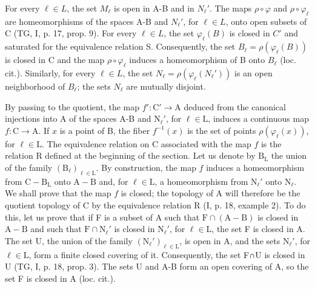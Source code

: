 For every \(\ell \in L\), the set \(M_{\ell}\) is open in A-B and in \(N_{\ell}'\). The maps \(\rho \circ \varphi\) and \(\rho \circ \varphi_{\ell}\) are homeomorphisms of the spaces A-B and \(N_{\ell}'\), for \(\ell \in L\), onto open subsets of C (TG, I, p. 17, prop. 9). For every \(\ell \in L\), the set \(\varphi_{\ell}(B)\) is closed in \(C'\) and saturated for the equivalence relation S. Consequently, the set \(B_{\ell} = \rho(\varphi_{\ell}(B))\) is closed in C and the map \(\rho \circ \varphi_{\ell}\) induces a homeomorphism of B onto \(B_{\ell}\) (loc. cit.). Similarly, for every \(\ell \in L\), the set \(N_{\ell} = \rho(\varphi_{\ell}(N_{\ell}'))\) is an open neighborhood of \(B_{\ell}\); the sets \(N_{\ell}\) are mutually disjoint.

By passing to the quotient, the map \(f' \colon \mathrm{C}' \to \mathrm{A}\) deduced from the canonical injections into A of the spaces A-B and \(\mathrm{N}_{\ell}'\), for \(\ell \in \mathrm{L}\), induces a continuous map \(f \colon \mathrm{C} \to \mathrm{A}\). If \(x\) is a point of B, the fiber \(f^{-1}(x)\) is the set of points \(\rho(\varphi_{\ell}(x))\), for \(\ell \in \mathrm{L}\). The equivalence relation on C associated with the map \(f\) is the relation R defined at the beginning of the section. Let us denote by \(\mathrm{B}_{\mathrm{L}}\) the union of the family \((\mathrm{B}_{\ell})_{\ell \in \mathrm{L}}\). By construction, the map \(f\) induces a homeomorphism from \(\mathrm{C} - \mathrm{B}_{\mathrm{L}}\) onto \(\mathrm{A} - \mathrm{B}\) and, for \(\ell \in \mathrm{L}\), a homeomorphism from \(\mathrm{N}_{\ell}'\) onto \(\mathrm{N}_{\ell}\). We shall prove that the map \(f\) is closed; the topology of A will therefore be the quotient topology of C by the equivalence relation R (I, p. 18, example 2). To do this, let us prove that if F is a subset of A such that \(\mathrm{F} \cap (\mathrm{A} - \mathrm{B})\) is closed in \(\mathrm{A} - \mathrm{B}\) and such that \(\mathrm{F} \cap \mathrm{N}_{\ell}'\) is closed in \(\mathrm{N}_{\ell}'\), for \(\ell \in \mathrm{L}\), the set F is closed in A. The set U, the union of the family \((\mathrm{N}_{\ell}')_{\ell \in \mathrm{L}}\), is open in A, and the sets \(\mathrm{N}_{\ell}'\), for \(\ell \in \mathrm{L}\), form a finite closed covering of it. Consequently, the set F∩U is closed in U (TG, I, p. 18, prop. 3). The sets U and A-B form an open covering of A, so the set F is closed in A (loc. cit.).

